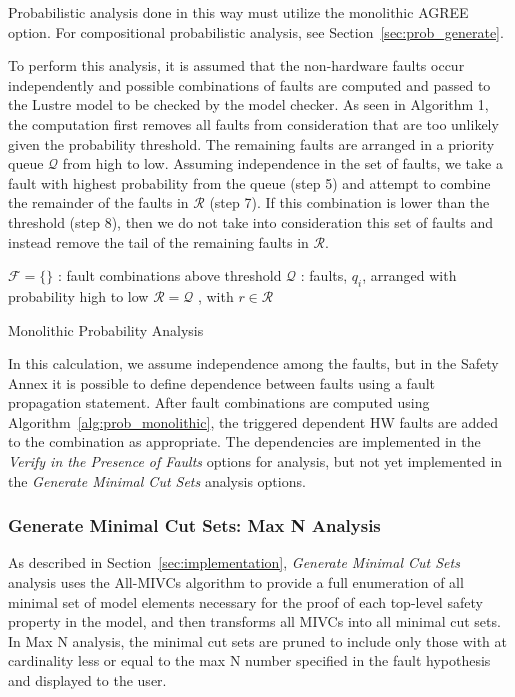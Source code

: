 Probabilistic analysis done in this way must utilize the monolithic AGREE option. For compositional probabilistic analysis, see Section~\ref{sec:prob_generate}.

To perform this analysis, it is assumed that the non-hardware faults occur independently and possible combinations of faults are computed and passed to the Lustre model to be checked by the model checker. As seen in Algorithm 1, the computation first removes all faults from consideration that are too unlikely given the probability threshold. The remaining faults are arranged in a priority queue $\mathcal{Q}$ from high to low. Assuming independence in the set of faults, we take a fault with highest probability from the queue (step 5) and attempt to combine the remainder of the faults in $\mathcal{R}$ (step 7). If this combination is lower than the threshold (step 8), then we do not take into consideration this set of faults and instead remove the tail of the remaining faults in $\mathcal{R}$. 
 
\begin{algorithm}[H]
	$\mathcal{F} = \{\}$ : fault combinations above threshold \;
	$\mathcal{Q}$ : faults, $q_i$, arranged with probability high to low \;
	$\mathcal{R} = \mathcal{Q}$ , with $r \in \mathcal{R}$\;
	\caption{Monolithic Probability Analysis}
	\label{alg:prob_monolithic}
\end{algorithm}
In this calculation, we assume independence among the faults, but in the Safety Annex it is possible to define dependence between faults using a fault propagation statement. After fault combinations are computed using Algorithm~\ref{alg:prob_monolithic}, the triggered dependent HW faults are added to the combination as appropriate. The dependencies are implemented in the \textit{Verify in the Presence of Faults} options for analysis, but not yet implemented in the \textit{Generate Minimal Cut Sets} analysis options.

\subsubsection{Generate Minimal Cut Sets: Max N Analysis}
\label{sec:maxN_generate}
As described in Section~\ref{sec:implementation}, \textit{Generate Minimal Cut Sets} analysis uses the All-MIVCs algorithm to provide a full enumeration of all minimal set of model elements necessary for the proof of each top-level safety property in the model, and then transforms all MIVCs into all minimal cut sets. In Max N analysis, the minimal cut sets are pruned to include only those with at cardinality less or equal to the max N number specified in the fault hypothesis and displayed to the user.

